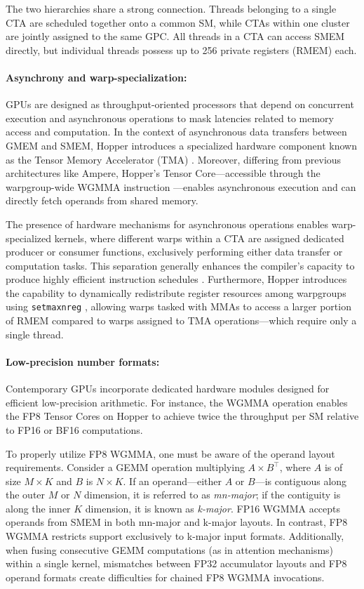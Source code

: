 The two hierarchies share a strong connection. Threads belonging to a single CTA are scheduled together onto a common SM, while CTAs within one cluster are jointly assigned to the same GPC. All threads in a CTA can access SMEM directly, but individual threads possess up to 256 private registers (RMEM) each.

\paragraph{Asynchrony and warp-specialization:}

GPUs are designed as throughput-oriented processors that depend on concurrent execution and asynchronous operations to mask latencies related to memory access and computation. In the context of asynchronous data transfers between GMEM and SMEM, Hopper introduces a specialized hardware component known as the Tensor Memory Accelerator (TMA) \cite[\S7.29]{cuda}. Moreover, differing from previous architectures like Ampere, Hopper’s Tensor Core—accessible through the warpgroup-wide WGMMA instruction \cite[\S9.7.14]{ptx}—enables asynchronous execution and can directly fetch operands from shared memory.

The presence of hardware mechanisms for asynchronous operations enables warp-specialized kernels, where different warps within a CTA are assigned dedicated producer or consumer functions, exclusively performing either data transfer or computation tasks. This separation generally enhances the compiler’s capacity to produce highly efficient instruction schedules \citep{warp-specialization-2011}. Furthermore, Hopper introduces the capability to dynamically redistribute register resources among warpgroups using \verb|setmaxnreg| \cite[\S9.7.17.1]{ptx}, allowing warps tasked with MMAs to access a larger portion of RMEM compared to warps assigned to TMA operations—which require only a single thread.

\paragraph{Low-precision number formats:}
\label{sec:low-precision-gpu}
Contemporary GPUs incorporate dedicated hardware modules designed for efficient low-precision arithmetic. For instance, the WGMMA operation enables the FP8 Tensor Cores on Hopper to achieve twice the throughput per SM relative to FP16 or BF16 computations.

To properly utilize FP8 WGMMA, one must be aware of the operand layout requirements. Consider a GEMM operation multiplying $A \times B^{\top}$, where $A$ is of size $M \times K$ and $B$ is $N \times K$. If an operand—either $A$ or $B$—is contiguous along the outer $M$ or $N$ dimension, it is referred to as \emph{mn-major}; if the contiguity is along the inner $K$ dimension, it is known as \emph{k-major}. FP16 WGMMA accepts operands from SMEM in both mn-major and k-major layouts. In contrast, FP8 WGMMA restricts support exclusively to k-major input formats. Additionally, when fusing consecutive GEMM computations (as in attention mechanisms) within a single kernel, mismatches between FP32 accumulator layouts and FP8 operand formats create difficulties for chained FP8 WGMMA invocations.

